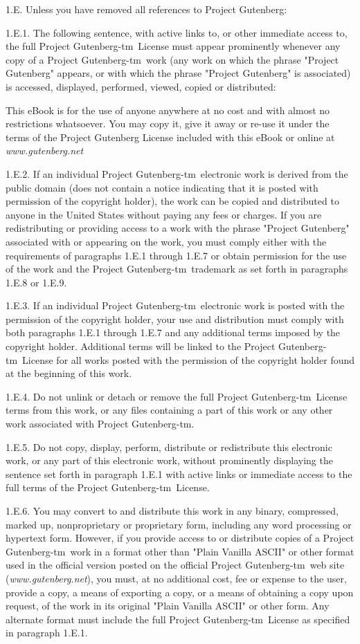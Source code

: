 \documentclass[11pt]{book}
\newcommand{\pgtm}{Project \mbox{Gutenberg-tm}}
\begin{document}
{\smallskip\noindent 1.E.  Unless you have removed all references to Project Gutenberg:

\smallskip\noindent 1.E.1.  The following sentence, with active links to, or other immediate
access to, the full \pgtm\ License must appear prominently
whenever any copy of a \pgtm\ work (any work on which the
phrase "Project Gutenberg" appears, or with which the phrase "Project
Gutenberg" is associated) is accessed, displayed, performed, viewed,
copied or distributed:

\smallskip\noindent This eBook is for the use of anyone anywhere at no cost and with
almost no restrictions whatsoever.  You may copy it, give it away or
re-use it under the terms of the Project Gutenberg License included
with this eBook or online at {\em www.gutenberg.net}

\smallskip\noindent 1.E.2.  If an individual \pgtm\ electronic work is derived
from the public domain (does not contain a notice indicating that it is
posted with permission of the copyright holder), the work can be copied
and distributed to anyone in the United States without paying any fees
or charges.  If you are redistributing or providing access to a work
with the phrase "Project Gutenberg" associated with or appearing on the
work, you must comply either with the requirements of paragraphs 1.E.1
through 1.E.7 or obtain permission for the use of the work and the
\pgtm\ trademark as set forth in paragraphs 1.E.8 or
1.E.9.

\smallskip\noindent 1.E.3.  If an individual \pgtm\ electronic work is posted
with the permission of the copyright holder, your use and distribution
must comply with both paragraphs 1.E.1 through 1.E.7 and any additional
terms imposed by the copyright holder.  Additional terms will be linked
to the \pgtm\ License for all works posted with the
permission of the copyright holder found at the beginning of this work.

\smallskip\noindent 1.E.4.  Do not unlink or detach or remove the full
\pgtm\ License terms from this work, or any files containing a part of this
work or any other work associated with \pgtm.

\smallskip\noindent 1.E.5.  Do not copy, display, perform, distribute or redistribute this
electronic work, or any part of this electronic work, without
prominently displaying the sentence set forth in paragraph 1.E.1 with
active links or immediate access to the full terms of the
\pgtm\ License.

\smallskip\noindent 1.E.6.  You may convert to and distribute this work in any binary,
compressed, marked up, nonproprietary or proprietary form, including any
word processing or hypertext form.  However, if you provide access to or
distribute copies of a \pgtm\ work in a format other than
"Plain Vanilla ASCII" or other format used in the official version
posted on the official \pgtm\ web site ({\em www.gutenberg.net}),
you must, at no additional cost, fee or expense to the user, provide a
copy, a means of exporting a copy, or a means of obtaining a copy upon
request, of the work in its original "Plain Vanilla ASCII" or other
form.  Any alternate format must include the full
\pgtm\ License as specified in paragraph 1.E.1.

}
\end{document}
